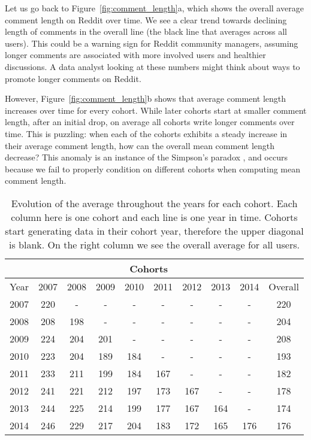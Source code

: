 Let us go back to Figure~\ref{fig:comment_length}a, which shows the overall average comment length on Reddit over time. We see a clear trend towards declining length of comments in the overall line (the black line that averages across all users). This could be a warning sign for Reddit community managers, assuming longer comments are associated with more involved users and healthier discussions. A data analyst looking at these numbers might think about ways to promote longer comments on Reddit. 

However, Figure~\ref{fig:comment_length}b shows that average comment length increases over time for every cohort. While later cohorts start at smaller comment length, after an initial drop, on average all cohorts write longer comments over time.  This is puzzling: when each of the cohorts exhibits a steady increase in their average comment length, how can the overall mean comment length decrease?  This anomaly is an instance of the Simpson's paradox \cite{simpson1951}, and occurs because we fail to properly condition on different cohorts when computing mean comment length. 

\begin{table}[!tb]
\centering
\tabcolsep=0.07cm
\singlespacing
\fontsize{9pt}{10.5pt}\selectfont
\begin{tabular}{|c|c|c|c|c|c|c|c|c|c|}
\cline{2-9}
\multicolumn{1}{c|}{} & \multicolumn{8}{c|}{Cohorts} \\ \hline
Year & 2007 & 2008 & 2009 & 2010 & 2011 & 2012 & 2013 & 2014 & Overall\\ \hline
2007 & 220 & - & - & - & - & - & - & - & 220 \\ \hline
2008 & 208 & 198 & - & - & - & - & - & - & 204 \\ \hline
2009 & 224 & 204 & 201 & - & - & - & - & - & 208 \\ \hline
2010 & 223 & 204 & 189 & 184 & - & - & - & - & 193 \\ \hline
2011 & 233 & 211 & 199 & 184 & 167 & - & - & - & 182 \\ \hline
2012 & 241 & 221 & 212 & 197 & 173 & 167 & - & - & 178 \\ \hline
2013 & 244 & 225 & 214 & 199 & 177 & 167 & 164 & - & 174 \\ \hline
2014 & 246 & 229 & 217 & 204 & 183 & 172 & 165 & 176 & 176 \\ \hline
\end{tabular}
\caption{Evolution of the average throughout the years for each cohort. Each column here is one cohort and each line is one year in time. Cohorts start generating data in their cohort year, therefore the upper diagonal is blank. On the right column we see the overall average for all users.}
\label{tab:simpson}
\end{table}

